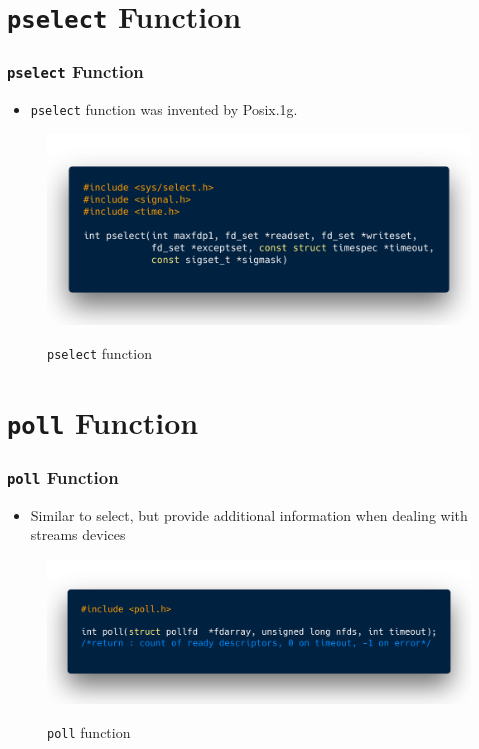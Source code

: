\documentclass[notes,serif]{beamer}
\begin{document}
\section{\texttt{pselect} Function}
\begin{frame}[containsverbatim]
\frametitle{\texttt{pselect} Function}
\begin{itemize}
  \item \texttt{pselect} function was invented by Posix.1g.
\end{itemize}
  \begin{figure}
  \centering
  \includegraphics[width=.8\textwidth]{code/03code03.png}\\
  \caption{\texttt{pselect} function}
  \label{13}
  \end{figure}
\end{frame}

\section{\texttt{poll} Function}
\begin{frame}[containsverbatim]
\frametitle{\texttt{poll} Function}
\begin{itemize}
  \item Similar to select, but provide additional information when dealing with streams devices
\end{itemize}
  \begin{figure}
  \centering
  \includegraphics[width=.8\textwidth]{code/03code04.png}\\
  \caption{\texttt{poll} function}
  \label{14}
  \end{figure}
\end{frame}
\end{document}
